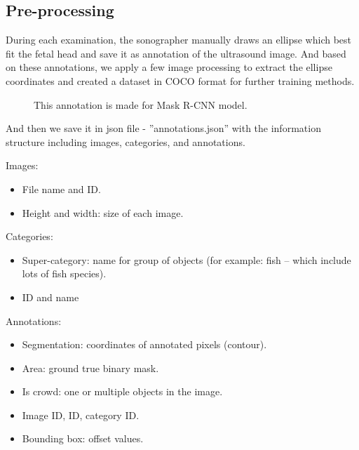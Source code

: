 	

\subsection{Pre-processing}
\noindent

	During each examination, the sonographer manually draws an ellipse which best fit the fetal head and save it as annotation of the ultrasound image. And based on these annotations, we apply a few image processing to extract the ellipse coordinates and created a dataset in COCO format for further training methods.
	
	\begin{figure}[H]
		\centering
		\caption{This annotation is made for Mask R-CNN model.}
	\end{figure}
	
	And then we save it in json file - ”annotations.json” with the information structure including images, categories, and annotations.

	Images:
\begin{itemize}
	\item File name and ID.
	\item Height and width: size of each image.
\end{itemize}

	Categories:
\begin{itemize}
	\item Super-category: name for group of objects (for example: fish – which include lots of fish species).
	\item ID and name
\end{itemize}

	Annotations:
\begin{itemize}
	
	\item Segmentation: coordinates of annotated pixels (contour).
	\item Area: ground true binary mask.
	\item Is crowd: one or multiple objects in the image.
	\item Image ID, ID, category ID.
	\item Bounding box: offset values.
\end{itemize}
	
